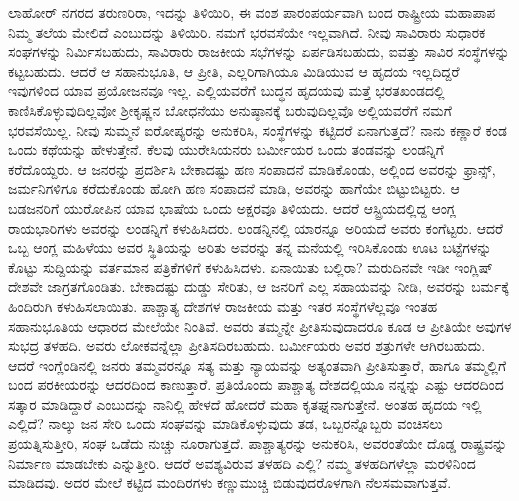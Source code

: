 ಲಾಹೋರ್​ ನಗರದ ತರುಣರಿರಾ, ಇದನ್ನು ತಿಳಿಯಿರಿ, ಈ ವಂಶ ಪಾರಂಪರ್ಯವಾಗಿ ಬಂದ ರಾಷ್ಟ್ರೀಯ ಮಹಾಪಾಪ ನಿಮ್ಮ ತಲೆಯ ಮೇಲಿದೆ ಎಂಬುದನ್ನು ತಿಳಿಯಿರಿ. ನಮಗೆ ಭರವಸೆಯೇ ಇಲ್ಲವಾಗಿದೆ. ನೀವು ಸಾವಿರಾರು ಸುಧಾರಕ ಸಂಘಗಳನ್ನು ನಿರ್ಮಿಸಬಹುದು, ಸಾವಿರಾರು ರಾಜಕೀಯ ಸಭೆಗಳನ್ನು ಏರ್ಪಡಿಸಬಹುದು, ಐವತ್ತು ಸಾವಿರ ಸಂಸ್ಥೆಗಳನ್ನು ಕಟ್ಟಬಹುದು. ಆದರೆ ಆ ಸಹಾನುಭೂತಿ, ಆ ಪ್ರೀತಿ, ಎಲ್ಲರಿಗಾಗಿಯೂ ಮಿಡಿಯುವ ಆ ಹೃದಯ ಇಲ್ಲದಿದ್ದರೆ ಇವುಗಳಿಂದ ಯಾವ ಪ್ರಯೋಜನವೂ ಇಲ್ಲ. ಎಲ್ಲಿಯವರೆಗೆ ಬುದ್ಧನ ಹೃದಯವು ಮತ್ತೆ ಭರತಖಂಡದಲ್ಲಿ ಕಾಣಿಸಿಕೊಳ್ಳುವುದಿಲ್ಲವೋ ಶ‍್ರೀಕೃಷ್ಣನ ಬೋಧನೆಯು ಅನುಷ್ಠಾನಕ್ಕೆ ಬರುವುದಿಲ್ಲವೊ ಅಲ್ಲಿಯವರೆಗೆ ನಮಗೆ ಭರವಸೆಯಿಲ್ಲ. ನೀವು ಸುಮ್ಮನೆ ಐರೋಪ್ಯರನ್ನು ಅನುಕರಿಸಿ, ಸಂಸ್ಥೆಗಳನ್ನು ಕಟ್ಟಿದರೆ ಏನಾಗುತ್ತದೆ? ನಾನು ಕಣ್ಣಾರೆ ಕಂಡ ಒಂದು ಕಥೆಯನ್ನು ಹೇಳುತ್ತೇನೆ. ಕೆಲವು ಯುರೇಸಿಯನರು ಬರ್ಮೀಯರ ಒಂದು ತಂಡವನ್ನು ಲಂಡನ್ನಿಗೆ ಕರೆದೊಯ್ದರು. ಆ ಜನರನ್ನು ಪ್ರದರ್ಶಿಸಿ ಬೇಕಾದಷ್ಟು ಹಣ ಸಂಪಾದನೆ ಮಾಡಿಕೊಂಡು, ಅಲ್ಲಿಂದ ಅವರನ್ನು ಫ್ರಾನ್ಸ್, ಜರ್ಮನಿಗಳಿಗೂ ಕರೆದುಕೊಂಡು ಹೋಗಿ ಹಣ ಸಂಪಾದನೆ ಮಾಡಿ, ಅವರನ್ನು ಹಾಗೆಯೇ ಬಿಟ್ಟುಬಿಟ್ಟರು. ಆ ಬಡಜನರಿಗೆ ಯುರೋಪಿನ ಯಾವ ಭಾಷೆಯ ಒಂದು ಅಕ್ಷರವೂ ತಿಳಿಯದು. ಆದರೆ ಆಸ್ಟ್ರಿಯದಲ್ಲಿದ್ದ ಆಂಗ್ಲ ರಾಯಭಾರಿಗಳು ಅವರನ್ನು ಲಂಡನ್ನಿಗೆ ಕಳುಹಿಸಿದರು. ಲಂಡನ್ನಿನಲ್ಲಿ ಯಾರನ್ನೂ ಅರಿಯದೆ ಅವರು ಕಂಗೆಟ್ಟರು. ಆದರೆ ಒಬ್ಬ ಆಂಗ್ಲ ಮಹಿಳೆಯು ಅವರ ಸ್ಥಿತಿಯನ್ನು ಅರಿತು ಅವರನ್ನು ತನ್ನ ಮನೆಯಲ್ಲಿ ಇರಿಸಿಕೊಂಡು ಊಟ ಬಟ್ಟೆಗಳನ್ನು ಕೊಟ್ಟು ಸುದ್ದಿಯನ್ನು ವರ್ತಮಾನ ಪತ್ರಿಕೆಗಳಿಗೆ ಕಳುಹಿಸಿದಳು. ಏನಾಯಿತು ಬಲ್ಲಿರಾ? ಮರುದಿನವೇ ಇಡೀ ಇಂಗ್ಲಿಷ್​ ದೇಶವೇ ಜಾಗ್ರತಗೊಂಡಿತು. ಬೇಕಾದಷ್ಟು ದುಡ್ಡು ಸೇರಿತು, ಆ ಜನರಿಗೆ ಎಲ್ಲ ಸಹಾಯವನ್ನು ನೀಡಿ, ಅವರನ್ನು ಬರ್ಮಕ್ಕೆ ಹಿಂದಿರುಗಿ ಕಳುಹಿಸಲಾಯಿತು. ಪಾಶ್ಚಾತ್ಯ ದೇಶಗಳ ರಾಜಕೀಯ ಮತ್ತು ಇತರ ಸಂಸ್ಥೆಗಳೆಲ್ಲವೂ ಇಂತಹ ಸಹಾನುಭೂತಿಯ ಆಧಾರದ ಮೇಲೆಯೇ ನಿಂತಿವೆ. ಅವರು ತಮ್ಮನ್ನೇ ಪ್ರೀತಿಸುವುದಾದರೂ ಕೂಡ ಆ ಪ್ರೀತಿಯೇ ಅವುಗಳ ಸುಭದ್ರ ತಳಹದಿ. ಅವರು ಲೋಕವನ್ನೆಲ್ಲಾ ಪ್ರೀತಿಸದಿರಬಹುದು. ಬರ್ಮೀಯರು ಅವರ ಶತ್ರುಗಳೇ ಆಗಿರಬಹುದು. ಆದರೆ ಇಂಗ್ಲೆಂಡಿನಲ್ಲಿ ಜನರು ತಮ್ಮವರನ್ನೂ ಸತ್ಯ ಮತ್ತು ನ್ಯಾಯವನ್ನು ಅತ್ಯಂತವಾಗಿ ಪ್ರೀತಿಸುತ್ತಾರೆ, ಹಾಗೂ ತಮ್ಮಲ್ಲಿಗೆ ಬಂದ ಪರಕೀಯರನ್ನು ಆದರದಿಂದ ಕಾಣುತ್ತಾರೆ. ಪ್ರತಿಯೊಂದು ಪಾಶ್ಚಾತ್ಯ ದೇಶದಲ್ಲಿಯೂ ನನ್ನನ್ನು ಎಷ್ಟು ಆದರದಿಂದ ಸತ್ಕಾರ ಮಾಡಿದ್ದಾರೆ ಎಂಬುದನ್ನು ನಾನಿಲ್ಲಿ ಹೇಳದೆ ಹೋದರೆ ಮಹಾ ಕೃತಘ್ನನಾಗುತ್ತೇನೆ. ಅಂತಹ ಹೃದಯ ಇಲ್ಲಿ ಎಲ್ಲಿದೆ? ನಾಲ್ಕು ಜನ ಸೇರಿ ಒಂದು ಸಂಘವನ್ನು ಮಾಡಿಕೊಳ್ಳುವುದು ತಡ, ಒಬ್ಬರನ್ನೊಬ್ಬರು ವಂಚಿಸಲು ಪ್ರಯತ್ನಿಸುತ್ತೀರಿ, ಸಂಘ ಒಡೆದು ನುಚ್ಚು ನೂರಾಗುತ್ತದೆ. ಪಾಶ್ಚಾತ್ಯರನ್ನು ಅನುಕರಿಸಿ, ಅವರಂತೆಯೇ ದೊಡ್ಡ ರಾಷ್ಟ್ರವನ್ನು ನಿರ್ಮಾಣ ಮಾಡಬೇಕು ಎನ್ನುತ್ತೀರಿ. ಆದರೆ ಅವಶ್ಯವಿರುವ ತಳಹದಿ ಎಲ್ಲಿ? ನಮ್ಮ ತಳಹದಿಗಳೆಲ್ಲಾ ಮರಳಿನಿಂದ ಮಾಡಿದವು. ಅದರ ಮೇಲೆ ಕಟ್ಟಿದ ಮಂದಿರಗಳು ಕಣ್ಣುಮುಚ್ಚಿ ಬಿಡುವುದರೊಳಗಾಗಿ ನೆಲಸಮವಾಗುತ್ತವೆ.

